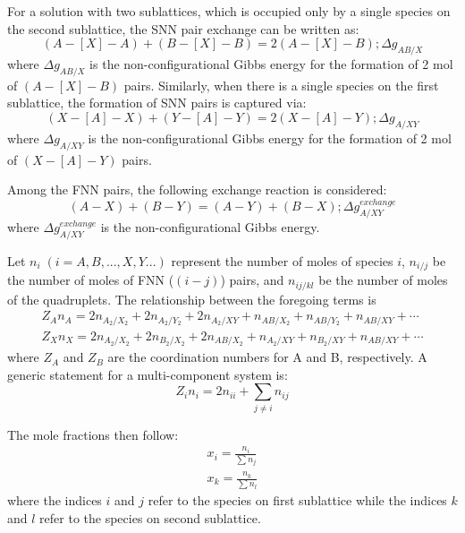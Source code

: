 \begin{enumerate}
        For a solution with two sublattices, which is occupied only by a single species on the second sublattice, the SNN pair exchange can be written as:
            \begin{equation} \label{SNNPairExchange1}
	            (A-[X]-A) + (B-[X]-B) = 2(A-[X]-B); \Delta g_{AB/X}
            \end{equation}
        where $\Delta g_{AB/X}$ is the non-configurational Gibbs energy for the formation of 2 mol of $(A-[X]-B)$ pairs. Similarly, when there is a single species on the first sublattice, the formation of SNN pairs is captured via:
            \begin{equation} \label{SNNPairExchange2}
	            (X-[A]-X) + (Y-[A]-Y) = 2(X-[A]-Y); \Delta g_{A/XY}
            \end{equation}
        where $\Delta g_{A/XY}$ is the non-configurational Gibbs energy for the formation of 2 mol of $(X-[A]-Y)$ pairs.

        Among the FNN pairs, the following exchange reaction is considered:
            \begin{equation} \label{FNNPairExchange}
	            (A-X) + (B-Y) = (A-Y) + (B-X); \Delta g_{A/XY}^{exchange}
            \end{equation}
        where $\Delta g_{A/XY}^{exchange}$ is the non-configurational Gibbs energy.

        Let $n_i \; (i=A,B,...,X,Y...)$ represent the number of moles of species $i$, $n_{i/j}$ be the number of moles of FNN ($(i - j)$) pairs, and $n_{ij/kl}$ be the number of moles of the quadruplets. The relationship between the foregoing terms is \cite{Pelton01b}
        \begin{gather}\label{EqMassBalance1}
	       Z_A n_A  = 2n_{A_2/X_2} + 2n_{A_2/Y_2} + 2n_{A_2/XY} + n_{AB/X_2} + n_{AB/Y_2} + n_{AB/XY} + \cdots \\
	       Z_X n_X  = 2n_{A_2/X_2} + 2n_{B_2/X_2} + 2n_{AB/X_2} + n_{A_2/XY} + n_{B_2/XY} + n_{AB/XY} + \cdots
        \end{gather}
        where $Z_A$ and $Z_B$ are the coordination numbers for A and B, respectively. A generic statement for a multi-component system is:
  	\begin{equation}
		Z_i n_i = 2n_{ii} + \sum_{j \ne i} n_{ij}
         \end{equation}

        The mole fractions then follow:
        \begin{gather} \label{EqMoleFraction}
            x_{i} = \frac{n_{i}}{\sum n_j} \\
            x_{k} = \frac{n_{k}}{\sum n_l}
        \end{gather}
        where the indices $i$ and $j$ refer to the species on first sublattice while the indices $k$ and $l$ refer to the species on second sublattice.


\end{enumerate}
